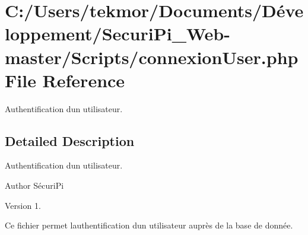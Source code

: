 \section{C\+:/\+Users/tekmor/\+Documents/\+Développement/\+Securi\+Pi\+\_\+\+Web-\/master/\+Scripts/connexion\+User.php File Reference}
\label{connexion_user_8php}


Authentification d\textquotesingle{}un utilisateur.  




\subsection{Detailed Description}
Authentification d\textquotesingle{}un utilisateur. 

\begin{DoxyAuthor}{Author}
S\'{e}curi\+Pi 
\end{DoxyAuthor}
\begin{DoxyVersion}{Version}
1.
\end{DoxyVersion}
Ce fichier permet l\textquotesingle{}authentification d\textquotesingle{}un utilisateur aupr\`{e}s de la base de donn\'{e}e. 